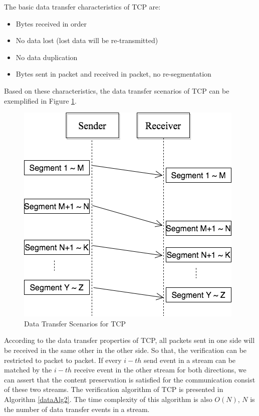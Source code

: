 The basic data transfer characteristics of TCP are:
\begin{itemize}
  \item Bytes received in order
  \item No data lost (lost data will be re-transmitted)
  \item No data duplication
  \item Bytes sent in packet and received in packet, no re-segmentation
\end{itemize}

Based on these characteristics,  the data transfer scenarios of TCP can be exemplified in Figure \ref{tcp}.

\begin{figure}[H]
\centerline{\includegraphics[scale=0.4]{Figures/tcp}}
 \caption{Data Transfer Scenarios for TCP}
\label{tcp}
\end{figure}

According to the data transfer properties of TCP, all packets sent in one side will be received in the same other in the other side. So that, the verification can be restricted to packet to packet. If every $i-th$ send event in a stream can be matched by the $i-th$ receive event in the other stream for both directions, we can assert that the content preservation is satisfied for the communication consist of these two streams. The verification algorithm of TCP is presented in Algorithm \ref{dataAlg2}. The time complexity of this algorithm is also $O(N)$, $N$ is the number of data transfer events in a stream.

